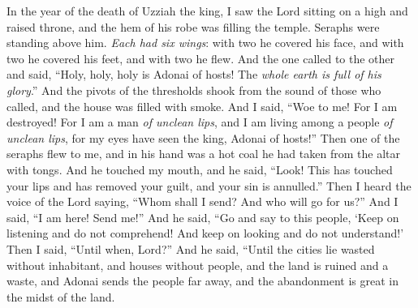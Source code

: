 \begin{biblechapter} %
 In the year of the death of Uzziah the king, I saw the Lord sitting on a high and raised throne, and the hem of his robe was filling the temple.
\verse Seraphs were standing above him. \textit{Each had six wings}: with two he covered his face, and with two he covered his feet, and with two he flew.
\verse And the one called to the other and said, “Holy, holy, holy is Adonai of hosts! 
The \textit{whole earth is full of his glory}.”
\verse And the pivots of the thresholds shook from the sound of those who called, and the house was filled with smoke.
\verse And I said, “Woe to me! For I am destroyed! For I am a man \textit{of unclean lips}, and I am living among a people \textit{of unclean lips}, for my eyes have seen the king, Adonai of hosts!”
\verse Then one of the seraphs flew to me, and in his hand was a hot coal he had taken from the altar with tongs.
\verse And he touched my mouth, and he said, “Look! This has touched your lips 
and has removed your guilt, 
and your sin is annulled.”
\verse Then I heard the voice of the Lord saying, “Whom shall I send? 
And who will go for us?” And I said, “I am here! 
Send me!”
\verse And he said, “Go and say to this people,
\verse ‘Keep on listening and do not comprehend! 
And keep on looking and do not understand!’
\verse Then I said, “Until when, Lord?” And he said,
\verse “Until the cities lie wasted without inhabitant, 
and houses without people, 
and the land is ruined and a waste,
\verse and Adonai sends the people far away, 
and the abandonment is great in the midst of the land.
\end{biblechapter}

